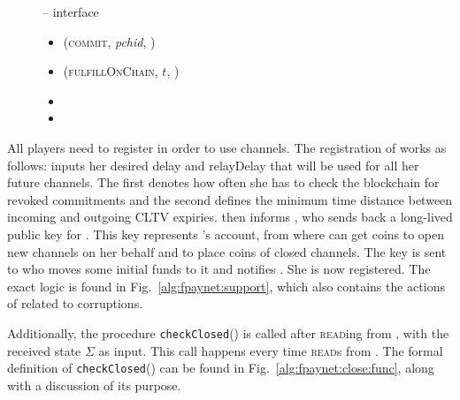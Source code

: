 \begin{figure}[H]
\begin{systembox}{\fpaynet{} -- interface}
\begin{itemize}
\begin{itemize}
          \item (\textsc{commit}, \textit{pchid}, \alice)
          \item (\textsc{fulfillOnChain}, $t$, \alice)
          \item {}
          \item {}
        \end{itemize}
      \end{itemize}
    \end{systembox}
    \caption{}
    \label{alg:fpaynet:interface}
  \end{figure}

  All players need to register in order to use channels. The registration of
  \alice{} works as follows: \alice{} inputs her desired delay and relayDelay
  that will be used for all her future channels. The first denotes how often she
  has to check the blockchain for revoked commitments and the second defines the
  minimum time distance between incoming and outgoing CLTV expiries. \fpaynet{}
  then informs \simulator{}, who sends back a long-lived public key for \alice.
  This key represents \alice's account, from where \fpaynet{} can get coins to
  open new channels on her behalf and to place coins of closed channels. The key
  is sent to \alice{} who moves some initial funds to it and notifies
  \fpaynet{}. She is now registered. The exact logic is found in
  Fig.~\ref{alg:fpaynet:support}, which also contains the actions of \fpaynet{}
  related to corruptions.

  Additionally, the procedure \texttt{checkClosed}() is called after
  \textsc{read}ing from \ledger, with the received state $\Sigma$ as input. This
  call happens every time \fpaynet{} \textsc{read}s from \ledger. The formal
  definition of \texttt{checkClosed}() can be found in
  Fig.~\ref{alg:fpaynet:close:func}, along with a discussion of its purpose.

